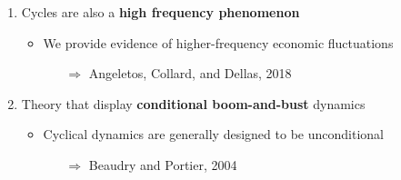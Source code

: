 \documentclass[hyperref={pdfpagelabels=false}]{beamer}
\begin{document}
{\begin{enumerate}
	\bigskip
	
	
	\item Cycles are also a \textbf{high frequency phenomenon}
	\begin{itemize}
		\item We provide evidence of higher-frequency economic fluctuations
		\begin{itemize}
			\item[$\Rightarrow$] Angeletos, Collard, and Dellas, 2018 
		\end{itemize}
		\end{itemize}
	
	
	\bigskip
	
	\item Theory that display \textbf{conditional boom-and-bust} dynamics
	\begin{itemize}
		\item Cyclical dynamics are generally designed to be unconditional
		\begin{itemize}
			\item[$\Rightarrow$] Beaudry and Portier, 2004
		\end{itemize} 
		\end{itemize}
	
	    
\end{enumerate}	
		
}

\end{document}
